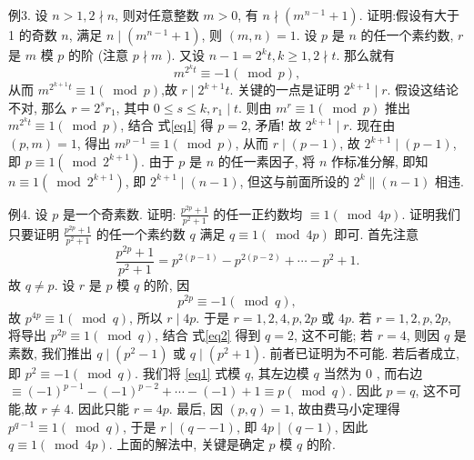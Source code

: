 例3. 设 $n>1,2 \nmid n$, 则对任意整数 $m>0$, 有 $n \nmid\left(m^{n-1}+1\right)$.
证明:假设有大于 1 的奇数 $n$, 满足 $n \mid\left(m^{n-1}+1\right)$, 则 $(m, n)=1$. 设 $p$ 是 $n$ 的任一个素约数, $r$ 是 $m$ 模 $p$ 的阶 (注意 $p \nmid m$ ). 又设 $n-1=2^k t, k \geqslant 1,2 \nmid t$. 那么就有
$$
m^{2^k t} \equiv-1(\bmod p), \label{eq1}
$$
从而 $m^{2^{k+1} t} \equiv 1(\bmod p)$,故 $r \mid 2^{k+1} t$.
关键的一点是证明 $2^{k+1} \mid r$. 假设这结论不对, 那么 $r=2^s r_1$, 其中 $0 \leqslant s \leqslant k, r_1 \mid t$. 则由 $m^r \equiv 1(\bmod p)$ 推出 $m^{2^k t} \equiv 1(\bmod p)$, 结合 式\ref{eq1} 得 $p=2$, 矛盾! 故 $2^{k+1} \mid r$.
现在由 $(p, m)=1$, 得出 $m^{p-1} \equiv 1(\bmod p)$, 从而 $r \mid(p-1)$, 故 $2^{k+1} \mid (p-1)$, 即 $p \equiv 1\left(\bmod 2^{k+1}\right)$. 由于 $p$ 是 $n$ 的任一素因子, 将 $n$ 作标准分解, 即知 $n \equiv 1\left(\bmod 2^{k+1}\right)$, 即 $2^{k+1} \mid(n-1)$, 但这与前面所设的 $2^k \|(n-1)$ 相违.



例4. 设 $p$ 是一个奇素数.
证明: $\frac{p^{2 p}+1}{p^2+1}$ 的任一正约数均 $\equiv 1(\bmod 4 p)$. 证明我们只要证明 $\frac{p^{2 p}+1}{p^2+1}$ 的任一个素约数 $q$ 满足 $q \equiv 1(\bmod 4 p)$ 即可.
首先注意
$$
\frac{p^{2 p}+1}{p^2+1}=p^{2(p-1)}-p^{2(p-2)}+\cdots-p^2+1 . \label{eq1}
$$
故 $q \neq p$. 设 $r$ 是 $p$ 模 $q$ 的阶, 因
$$
p^{2 p} \equiv-1(\bmod q), \label{eq2}
$$
故 $p^{4 p} \equiv 1(\bmod q)$, 所以 $r \mid 4 p$. 于是 $r=1,2,4, p, 2 p$ 或 $4 p$.
若 $r=1,2, p, 2 p$, 将导出 $p^{2 p} \equiv 1(\bmod q)$, 结合 式\ref{eq2} 得到 $q=2$, 这不可能; 若 $r=4$, 则因 $q$ 是素数, 我们推出 $q \mid\left(p^2-1\right)$ 或 $q \mid\left(p^2+1\right)$. 前者已证明为不可能.
若后者成立, 即 $p^2 \equiv-1(\bmod q)$. 我们将 \ref{eq1} 式模 $q$, 其左边模 $q$ 当然为 0 , 而右边 $\equiv(-1)^{p-1}-(-1)^{p-2}+\cdots-(-1)+1 \equiv p(\bmod q)$. 因此 $p= q$, 这不可能,故 $r \neq 4$. 因此只能 $r=4 p$.
最后, 因 $(p, q)=1$, 故由费马小定理得 $p^{q-1} \equiv 1(\bmod q)$, 于是 $r \mid(q-- 1)$, 即 $4 p \mid(q-1)$, 因此 $q \equiv 1(\bmod 4 p)$.
上面的解法中, 关键是确定 $p$ 模 $q$ 的阶.



